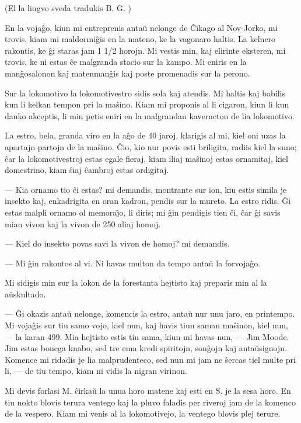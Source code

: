 \begin{center}
\footnotesize (El la lingvo sveda tradukis B. G. )
\end{center}

   En la voja\^go, kiun mi entreprenis anta\u u nelonge de \^Cikago al
Nov-Jorko, mi trovis, kiam mi maldormi\^gis en la mateno, ke la
vagonaro haltis. La kelnero rakontis, ke \^gi staras jam 1 1/2
horojn. Mi vestis min, kaj elirinte eksteren, mi trovis, ke ni estas
\^ce malgranda stacio sur la kampo. Mi eniris en la man\^gosalonon
kaj matenman\^gis kaj poste promenadis sur la perono.

   Sur la lokomotivo la lokomotivestro sidis sola kaj atendis. Mi haltis
kaj babilis kun li kelkan tempon pri la ma\^sino. Kiam mi proponis
al li cigaron, kiun li kun danko akceptis, li min petis eniri en la
malgrandan kaverneton de lia lokomotivo.

   La estro, bela, granda viro en la a\^go de 40 jaroj, klarigis al mi,
kiel oni uzas la apartajn partojn de la ma\^sino. \^Cio, kio nur
povis esti briligita, radiis kiel la suno; \^car la lokomotivestroj
estas egale fieraj, kiam iliaj ma\^sinoj estas ornamitaj, kiel
domestrino, kiam \^siaj \^cambroj estas ordigitaj.

 --- Kia ornamo tio \^ci estas? mi demandis, montrante sur ion, kiu
estis simila je insekto kaj, enkadrigita en oran kadron, pendis sur
la mureto. La estro ridis. \^Gi estas malpli ornamo ol
memora\^{\j}o, li diris; mi \^gin pendigis tien \^ci, \^car \^gi
savis mian vivon kaj la vivon de 250 aliaj homoj.

 --- Kiel do insekto povas savi la vivon de homoj? mi demandis.

 --- Mi \^gin rakontos al vi. Ni havas multon da tempo anta\u u la
forvoja\^go.

   Mi sidigis min sur la lokon de la forestanta hejtisto kaj preparis
min al la a\u uskultado.

 --- \^Gi okazis anta\u u nelonge, komencis la estro, anta\u u nur unu jaro,
en printempo. Mi voja\^gis sur tiu samo vojo, kiel nun, kaj havis
tiun saman ma\^sinon, kiel nun, --- la karan 499. Mia hejtisto estis
tiu sama, kiun mi havas nun, --- Jim Moode. Jim estas bonega knabo,
sed tre ema kredi spiritojn, son\^gojn kaj anta\u usignojn. Komence
mi ridadis je lia malprudenteco, sed nun mi jam ne \^sercas tiel
multe pri li, --- de tiu tempo, kiam ni vidis la nigran virinon.

   Mi devis forlasi M. \^cirka\u u la unua horo matene kaj esti en S. je
la sesa horo. En tiu nokto blovis terura ventego kaj la pluvo
faladis per riveroj jam de la komenco de la vespero. Kiam mi venis
al la lokomotivejo, la ventego blovis plej terure.

